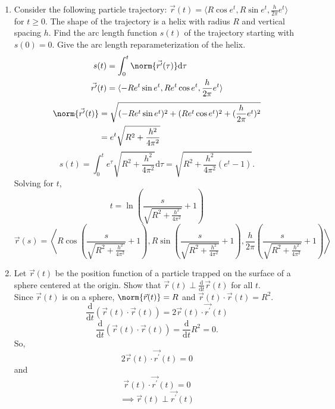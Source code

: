 \begin{enumerate}
	\item Consider the following particle trajectory: $\vec{r}(t) = \langle R\cos{e^t}, R\sin{e^t}, \frac{h}{2\pi}e^t \rangle$ for $t \geq 0$. The shape of the trajectory is a helix with radius $R$ and vertical spacing $h$. Find the arc length function $s(t)$ of the trajectory starting with $s(0) = 0$. Give the arc length reparameterization of the helix.
	\begin{align*}
		s(t) &= \int_{0}^{t}{\norm{\vec{r^\prime}(\tau)}\mathrm{d}\tau}\\
		\vec{r^\prime}(t) &= \langle -Re^{t}\sin{e^t}, Re^{t}\cos{e^t}, \frac{h}{2\pi}e^{t} \rangle
	\end{align*}
	\begin{align*}
		\norm{\vec{r^\prime}(t)} &= \sqrt{(-Re^{t}\sin{e^t})^2 + (Re^{t}\cos{e^t})^2 + (\frac{h}{2\pi}e^t)^2} \\
		&= e^{t}\sqrt{R^2 + \frac{h^2}{4\pi^2}}
	\end{align*}
	\begin{equation*}
		s(t) = \int_{0}^{t}{e^{\tau}\sqrt{R^2 + \frac{h^2}{4\pi^2}}\mathrm{d}\tau} = \sqrt{R^2 + \frac{h^2}{4\pi^2}(e^{t} - 1)}.
	\end{equation*}
	Solving for $t$,
	\begin{equation*}
		t = \ln{\left(\frac{s}{\sqrt{R^2 + \frac{h^2}{4\pi^2}}} + 1\right)}
	\end{equation*}
	\begin{equation*}
		\vec{r}(s) = \left< R\cos{\left(\frac{s}{\sqrt{R^2 + \frac{h^2}{4\pi^2}}} + 1\right)}, R\sin{\left(\frac{s}{\sqrt{R^2 + \frac{h^2}{4\pi^2}}} + 1\right)}, \frac{h}{2\pi}\left(\frac{s}{\sqrt{R^2 +\frac{h^2}{4\pi^2}}} + 1\right) \right>
	\end{equation*}
	
	\item Let $\vec{r}(t)$ be the position function of a particle trapped on the surface of a sphere centered at the origin. Show that $\vec{r}(t)\perp\frac{\mathrm{d}}{\mathrm{d}t}\vec{r}(t)$ for all $t$.\\
	Since $\vec{r}(t)$ is on a sphere, $\norm{\vec{r}(t)} = R$ and $\vec{r}(t) \cdot \vec{r}(t) = R^2$.
	\begin{equation*}
		\frac{\mathrm{d}}{\mathrm{d}t}(\vec{r}(t) \cdot \vec{r}(t)) = 2\vec{r}(t) \cdot \vec{r^\prime}(t)
	\end{equation*}
	\begin{equation*}
		\frac{\mathrm{d}}{\mathrm{d}t}(\vec{r}(t) \cdot \vec{r}(t)) = \frac{\mathrm{d}}{\mathrm{d}t}R^2 = 0.
	\end{equation*}
	So, 
	\begin{equation*}
		2\vec{r}(t) \cdot \vec{r^\prime}(t) = 0
	\end{equation*}
	and 
	\begin{equation*}
		\vec{r}(t) \cdot \vec{r^\prime}(t) = 0
	\end{equation*}
	\begin{equation*}
		\implies \vec{r}(t)\perp\vec{r^\prime}(t)
	\end{equation*}
\end{enumerate}